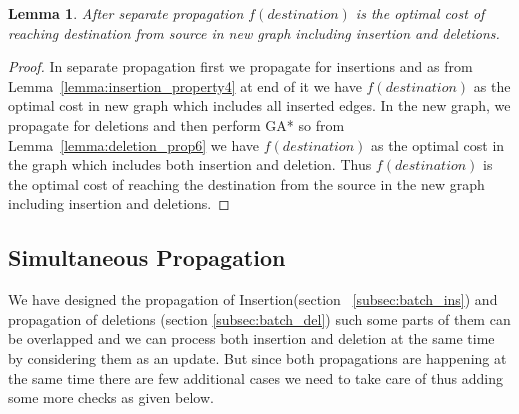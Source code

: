 \documentclass[a4paper]{article}
\newtheorem{lemma}[theorem]{Lemma}
\begin{document}
\begin{lemma}\label{lemma:sep_propagation_correctness}
After separate propagation $f(destination)$ is the optimal cost of reaching destination from source in new graph including insertion and deletions.
\end{lemma}
\begin{proof}
In separate propagation first we propagate for insertions and as from Lemma~\ref{lemma:insertion_property4} at end of it we have $f(destination)$ as the optimal cost in new graph which includes all inserted edges.
In the new graph, we propagate for deletions and then perform GA* so from Lemma~\ref{lemma:deletion_prop6} we have $f(destination)$ as the optimal cost in the graph which includes both insertion and deletion. Thus $f(destination)$ is the optimal cost of reaching the destination from the source in the new graph including insertion and deletions.
\end{proof}

\subsection{Simultaneous Propagation}\label{subsec:sim_propagation}
We have designed the propagation of Insertion(section ~\ref{subsec:batch_ins}) and propagation of deletions (section \ref{subsec:batch_del}) such some parts of them can be overlapped and we can process both insertion and deletion at the same time by considering them as an update. But since both propagations are happening at the same time there are few additional cases we need to take care of thus adding some more checks as given below.
\end{document}
